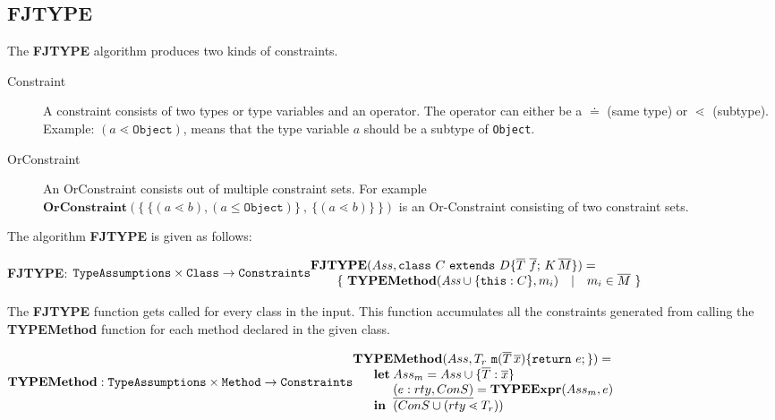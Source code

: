 \documentclass[runningheads]{llncs}
\begin{document}
\subsection{FJTYPE}
The \textbf{FJTYPE} algorithm produces two kinds of constraints.
\begin{description}
\item[Constraint] A constraint consists of two types or type variables and an operator.
The operator can either be a $\doteq$ (same type) or $\lessdot$ (subtype).
Example: $(a \lessdot \mathtt{Object})$, means that the type variable $a$ should be a subtype of \texttt{Object}.
\item[OrConstraint] An OrConstraint consists out of multiple constraint sets.
For example $\textbf{OrConstraint}(\{ \ \{ (a \lessdot b), (a \leq \mathtt{Object}) \} \ , \ \{ (a \lessdot b)\} \ \})$
is an Or-Constraint consisting of two constraint sets.
\end{description}

The algorithm \textbf{FJTYPE} is given as follows:

\textbf{FJTYPE}:
$\texttt{TypeAssumptions} \times
\texttt{Class} \rightarrow \texttt{Constraints}\\
 \begin{array}{@{}l@{}l@{}l}
 \textbf{FJT}&\textbf{Y} & \textbf{PE}(Ass, \mathtt{class } \ C \ \mathtt{ extends } \ D \{ \overline{T} \ \overline{f}; \, K \, \overline{M} \}) =\\
& \multicolumn{2}{@{}l@{}}{ \{ \ \textbf{TYPEMethod}(\textit{Ass} \cup \{ \mathtt{this} : C \}, m_i) \quad | \quad m_i \in \overline{M} \ \} }\\ 
\end{array}$

The \textbf{FJTYPE} function gets called for every class in the input.
This function accumulates all the constraints generated from calling the
\textbf{TYPEMethod} function for each method declared in the given class.

$\textbf{TYPEMethod}:\texttt{TypeAssumptions} \times
\texttt{Method} \rightarrow \texttt{Constraints}\\
\begin{array}{@{}l@{}l@{}l}
\textbf{TY}& \textbf{PE} & \textbf{Method} (Ass, T_r \ \mathtt{m}(\overline{T} \, \overline{x})\{ \mathtt{ return }\ e; \}) =\\
& \textbf{let}
& Ass_m = Ass \cup \{ \overline{T} : \overline{x} \}\\
& & \ul{(e:rty, ConS)} = \textbf{TYPEExpr}(Ass_m, e)\\
& \mathbf{in}
& (ConS \cup (rty \lessdot T_r))\\
\end{array}
$
\end{document}
